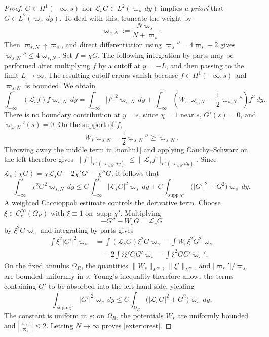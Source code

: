 \documentclass[11pt,a4paper]{article}
\numberwithin{equation}{section}
\theoremstyle{plain}
\theoremstyle{remark}
\begin{document}
\begin{proof}
$G\in H^1(-\infty,s)$ nor $\mathscr L_sG\in L^2(\varpi_s\,dy)$
implies \emph{a priori} that $G\in L^2(\varpi_s\,dy)$. To deal with this, truncate the weight by
$$
\varpi_{s,N}:=\frac{N\varpi_s}{N+\varpi_s}.
$$
Then $\varpi_{s,N}\uparrow\varpi_s$, and direct differentiation
using $\varpi_s''=4\varpi_s-2$ gives $\varpi_{s,N}''\leq4\varpi_{s,N}$. Set $f=\chi G$. The following integration by parts may be
performed after multiplying $f$ by a cutoff at $y=-L$, and then
passing to the limit $L\to\infty$. The resulting cutoff errors
vanish because $f\in H^1(-\infty,s)$ and
$\varpi_{s,N}$ is bounded. We obtain
\begin{equation}\label{nonlin1}
    \int_{-\infty}^s(\mathscr L_sf)f\varpi_{s,N}\,dy=\int_{-\infty}^s|f'|^2\varpi_{s,N}\,dy+
    \int_{-\infty}^s\left(W_s\varpi_{s,N}-\frac12\varpi_{s,N}''\right)f^2\,dy.
\end{equation}
There is no boundary contribution at $y=s$, since
$\chi=1$ near $s$, $G'(s)=0$, and
$\varpi_{s,N}'(s)=0$. On the support of $f$,
$$
W_s\varpi_{s,N}
-\frac12\varpi_{s,N}''
\geq
\varpi_{s,N}.
$$
Throwing away the middle term in \eqref{nonlin1} and applying Cauchy--Schwarz on the left therefore gives $\|f\|_{L^2(\varpi_{s,N}dy)}
\leq
\|\mathscr L_sf\|_{L^2(\varpi_{s,N}dy)}$. Since $\mathscr L_s(\chi G)
=
\chi \mathscr L_sG-2\chi'G'-\chi''G$, it follows that
$$
\int_{-\infty}^s\chi^2G^2\varpi_{s,N}\,dy
\leq
C\int_{-\infty}^s|\mathscr L_sG|^2\varpi_s\,dy
+
C\int_{\operatorname{supp}\chi'}
\bigl(|G'|^2+G^2\bigr)\varpi_s\,dy.
$$
A weighted Caccioppoli estimate controls the derivative term. Choose
$\xi\in C_c^\infty(\Omega_R)$ with
$\xi\equiv1$ on $\operatorname{supp}\chi'$. Multiplying
$$
-G''+W_sG=\mathscr L_sG
$$
by $\xi^2G\varpi_s$ and integrating by parts gives
$$
\begin{aligned}
\int \xi^2|G'|^2\varpi_s
&=
\int (\mathscr L_sG)\xi^2G\varpi_s
-\int W_s\xi^2G^2\varpi_s  \\
&\quad
-2\int \xi\xi'GG'\varpi_s
-\int \xi^2GG'\varpi_s'.
\end{aligned}
$$
On the fixed annulus $\Omega_R$, the quantities
$\|W_s\|_{L^\infty}$, $\|\xi'\|_{L^\infty}$, and
$|\varpi_s'|/\varpi_s$ are bounded uniformly in $s$. Young's
inequality therefore allows the terms containing $G'$ to be
absorbed into the left-hand side, yielding
$$
\int_{\operatorname{supp}\chi'}|G'|^2\varpi_s\,dy
\leq
C\int_{\Omega_R}
\bigl(|\mathscr L_sG|^2+G^2\bigr)\varpi_s\,dy.
$$
The constant is uniform in $s$: on $\Omega_R$, the potentials $W_s$
are uniformly bounded and $\left|\frac{\varpi_s'}{\varpi_s}\right|\leq2$. Letting $N\to\infty$ proves
\eqref{exteriorest}. 


\end{proof}
\end{document}
